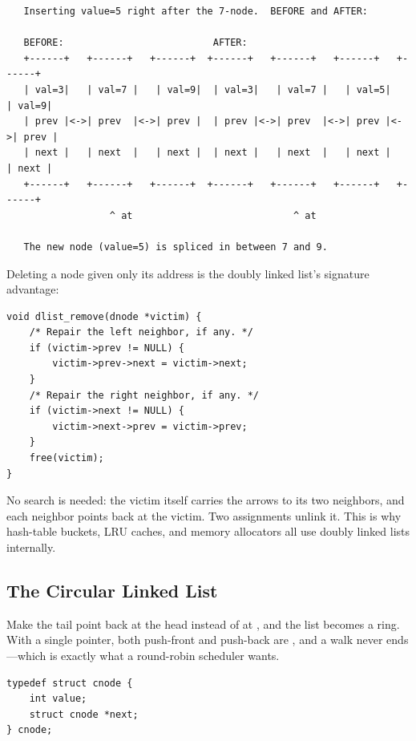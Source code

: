 \begin{verbatim}
   Inserting value=5 right after the 7-node.  BEFORE and AFTER:

   BEFORE:                          AFTER:
   +------+   +------+   +------+  +------+   +------+   +------+   +------+
   | val=3|   | val=7 |   | val=9|  | val=3|   | val=7 |   | val=5|   | val=9|
   | prev |<->| prev  |<->| prev |  | prev |<->| prev  |<->| prev |<->| prev |
   | next |   | next  |   | next |  | next |   | next  |   | next |   | next |
   +------+   +------+   +------+  +------+   +------+   +------+   +------+
                  ^ at                            ^ at

   The new node (value=5) is spliced in between 7 and 9.
\end{verbatim}

Deleting a node given only its address is the doubly linked list's
signature advantage:

\begin{lstlisting}[caption={Delete a node in O(1), given its address.}]
void dlist_remove(dnode *victim) {
    /* Repair the left neighbor, if any. */
    if (victim->prev != NULL) {
        victim->prev->next = victim->next;
    }
    /* Repair the right neighbor, if any. */
    if (victim->next != NULL) {
        victim->next->prev = victim->prev;
    }
    free(victim);
}
\end{lstlisting}

No search is needed: the victim itself carries the arrows to its two
neighbors, and each neighbor points back at the victim. Two assignments
unlink it. This is why hash-table buckets, LRU caches, and memory
allocators all use doubly linked lists internally.

\subsection{The Circular Linked List}

Make the tail point back at the head instead of at , and the
list becomes a ring. With a single  pointer, both push-front
and push-back are , and a walk never ends---which is exactly
what a round-robin scheduler wants.

\begin{lstlisting}[caption={The circular node is just a node; the ring is a convention.}]
typedef struct cnode {
    int value;
    struct cnode *next;
} cnode;
\end{lstlisting}

